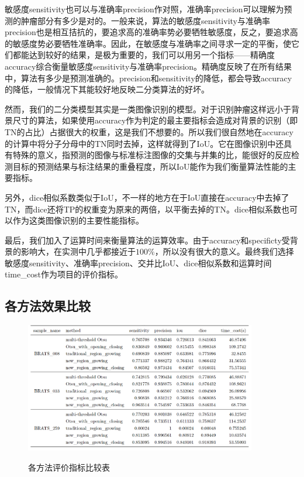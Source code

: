 \documentclass[UTF8]{ctexart}
\begin{document}
	敏感度sensitivity也可以与准确率precision作对照，准确率precision可以理解为预测的肿瘤部分有多少是对的。一般来说，算法的敏感度sensitivity与准确率precision也是相互拮抗的，要追求高的准确率势必要牺牲敏感度，反之，要追求高的敏感度势必要牺牲准确率。因此，在敏感度与准确率之间寻求一定的平衡，使它们都能达到较好的结果，是极为重要的，我们可以用另一个指标——精确度accuracy综合衡量敏感度sensitivity与准确率precision。精确度反映了在所有结果中，算法有多少是预测准确的。precision和sensitivity的降低，都会导致accuracy的降低，一般情况下其能较好地反映二分类算法的好坏。
	
	然而，我们的二分类模型其实是一类图像识别的模型。对于识别肿瘤这样远小于背景尺寸的算法，如果使用accuracy作为判定的最主要指标会造成对背景的识别（即TN的占比）占据很大的权重，这是我们不想要的。所以我们很自然地在accuracy的计算中将分子分母中的TN同时去掉，这样就得到了IoU。它在图像识别中还具有特殊的意义，指预测的图像与标准标注图像的交集与并集的比，能很好的反应检测目标的预测结果与标注结果的重叠程度，所以IoU能作为我们衡量算法性能的主要指标。
	
	另外，dice相似系数类似于IoU，不一样的地方在于IoU直接在accuracy中去掉了TN，而dice还将TP的权重变为原来的两倍，以平衡去掉的TN。dice相似系数也可以作为这类图像识别的主要性能指标。

	最后，我们加入了运算时间来衡量算法的运算效率。由于accuracy和specificty受背景的影响大，在实测中几乎都接近于$100\%$，所以没有很大的意义。最终我们选择敏感度sensitivity、准确率precision、交并比IoU、dice相似系数和运算时间time\_cost作为项目的评价指标。
\subsection{各方法效果比较}

\begin{figure}[H]
    \centering  %
    \includegraphics[width=0.9\textwidth]{figure/result_table.png}
    \label{tab:result}
    \caption{各方法评价指标比较表}
\end{figure}
\end{document}
